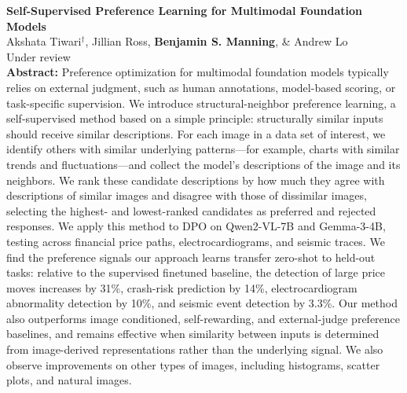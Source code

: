 \documentclass[11pt]{article}
\newenvironment{publist}
  {\begin{list}{}{%
    \setlength{\leftmargin}{1.5em}%
    \setlength{\itemindent}{-1.5em}%
    \setlength{\itemsep}{10pt}%
    \setlength{\parsep}{0pt}%
    \setlength{\topsep}{4pt}}}
  {\end{list}}
\begin{document}
\begin{publist}
\item \textbf{Self-Supervised Preference Learning for Multimodal Foundation Models}\\
Akshata Tiwari$^\dagger$, Jillian Ross, \textbf{Benjamin S. Manning}, \& Andrew Lo\\
Under review\\[3pt]
{\footnotesize \textbf{Abstract: }
Preference optimization for multimodal foundation models typically relies on external judgment, such as human annotations, model-based scoring, or task-specific supervision.
We introduce structural-neighbor preference learning, a self-supervised method based on a simple principle: structurally similar inputs should receive similar descriptions.
For each image in a data set of interest, we identify others with similar underlying patterns---for example, charts with similar trends and fluctuations---and collect the model's descriptions of the image and its neighbors.
We rank these candidate descriptions by how much they agree with descriptions of similar images and disagree with those of dissimilar images, selecting the highest- and lowest-ranked candidates as preferred and rejected responses.
We apply this method to DPO on Qwen2-VL-7B and Gemma-3-4B, testing across financial price paths, electrocardiograms, and seismic traces.
We find the preference signals our approach learns transfer zero-shot to held-out tasks: relative to the supervised finetuned baseline, the detection of large price moves increases by 31\%, crash-risk prediction by 14\%, electrocardiogram abnormality detection by 10\%, and seismic event detection by 3.3\%.
Our method also outperforms image conditioned, self-rewarding, and external-judge preference baselines, and remains effective when similarity between inputs is determined from image-derived representations rather than the underlying signal.
We also observe improvements on other types of images, including histograms, scatter plots, and natural images.}


\end{publist}
\end{document}
